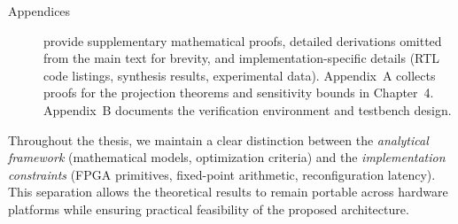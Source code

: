 \begin{description}
\item[Appendices] provide supplementary mathematical proofs, detailed derivations omitted from the main text for brevity, and implementation-specific details (RTL code listings, synthesis results, experimental data). Appendix~A collects proofs for the projection theorems and sensitivity bounds in Chapter~4. Appendix~B documents the verification environment and testbench design.
\end{description}

\noindent Throughout the thesis, we maintain a clear distinction between the \emph{analytical framework} (mathematical models, optimization criteria) and the \emph{implementation constraints} (FPGA primitives, fixed-point arithmetic, reconfiguration latency). This separation allows the theoretical results to remain portable across hardware platforms while ensuring practical feasibility of the proposed architecture.
